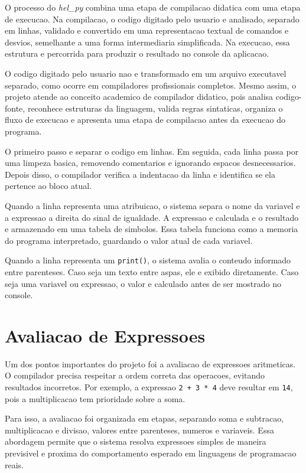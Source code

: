\documentclass[12pt,a4paper]{article}
\begin{document}
O processo do \textit{hel\_py} combina uma etapa de compilacao didatica com uma etapa de execucao. Na compilacao, o codigo digitado pelo usuario e analisado, separado em linhas, validado e convertido em uma representacao textual de comandos e desvios, semelhante a uma forma intermediaria simplificada. Na execucao, essa estrutura e percorrida para produzir o resultado no console da aplicacao.

O codigo digitado pelo usuario nao e transformado em um arquivo executavel separado, como ocorre em compiladores profissionais completos. Mesmo assim, o projeto atende ao conceito academico de compilador didatico, pois analisa codigo-fonte, reconhece estruturas da linguagem, valida regras sintaticas, organiza o fluxo de execucao e apresenta uma etapa de compilacao antes da execucao do programa.

O primeiro passo e separar o codigo em linhas. Em seguida, cada linha passa por uma limpeza basica, removendo comentarios e ignorando espacos desnecessarios. Depois disso, o compilador verifica a indentacao da linha e identifica se ela pertence ao bloco atual.

Quando a linha representa uma atribuicao, o sistema separa o nome da variavel e a expressao a direita do sinal de igualdade. A expressao e calculada e o resultado e armazenado em uma tabela de simbolos. Essa tabela funciona como a memoria do programa interpretado, guardando o valor atual de cada variavel.

Quando a linha representa um \texttt{print()}, o sistema avalia o conteudo informado entre parenteses. Caso seja um texto entre aspas, ele e exibido diretamente. Caso seja uma variavel ou expressao, o valor e calculado antes de ser mostrado no console.

\section{Avaliacao de Expressoes}

Um dos pontos importantes do projeto foi a avaliacao de expressoes aritmeticas. O compilador precisa respeitar a ordem correta das operacoes, evitando resultados incorretos. Por exemplo, a expressao \texttt{2 + 3 * 4} deve resultar em \texttt{14}, pois a multiplicacao tem prioridade sobre a soma.

Para isso, a avaliacao foi organizada em etapas, separando soma e subtracao, multiplicacao e divisao, valores entre parenteses, numeros e variaveis. Essa abordagem permite que o sistema resolva expressoes simples de maneira previsivel e proxima do comportamento esperado em linguagens de programacao reais.
\end{document}

